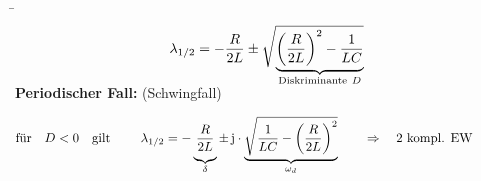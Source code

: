\begin{frame}\ftx{\subsubsecname}%
\b{%
    \begin{minipage}{\textwidth}\centering
        \begin{minipage}[t][3cm][]{0.48\textwidth}\centering
        \end{minipage}%
        \begin{minipage}[t][3cm][]{0.48\textwidth}\centering
            \begin{align*}
                \lambda_{1/2} = -\frac{R}{2L} \pm \sqrt{
                    \smash{\underbrace{%
                    \left(\frac{R}{2L}\right)^2 - \frac{1}{LC}
                    }_{\mathclap{\text{Diskriminante}\ D}}}
                    \vphantom{\left(\frac{R}{2L}\right)^2 - \frac{1}{LC}}%
                }%
            \end{align*}
        \end{minipage}
    \end{minipage}\vspace{2pt}
    \textbf{Periodischer Fall:} (Schwingfall)%
}%
\ifvmode\vspace*{-\baselineskip}\setlength{\parskip}{4pt}\fi%
\begin{align}
    &\text{für}\quad D < 0 \quad\text{gilt}&
        \lambda_{1/2} &= -\underbrace{
            \vphantom{\sqrt{\left(\frac{R}{2L}\right)^2}}
            \frac{R}{2L}
        }_{\delta} \pm \, \mathrm{j} \cdot \underbrace{
            \sqrt{\frac{1}{LC} - \left(\frac{R}{2L}\right)^2}
        }_{\omega_d}
        &&\Rightarrow\quad \text{2 kompl. EW} \label{eq:dgl:rlc:lambda:periodisch}
        \\[-15pt] &\hphantom{1rrrrrrrrrrrrrrrr} &   \hphantom{2llllll}&\hphantom{\mathrel{\phantom{=}}2rrrrrrrrrrrrrrrrrrrrrrrrrrr}     &&\hphantom{3rrrrrrrrrrrrrrrrrrrrrrrr} \nonumber

\end{align}
\end{frame}
